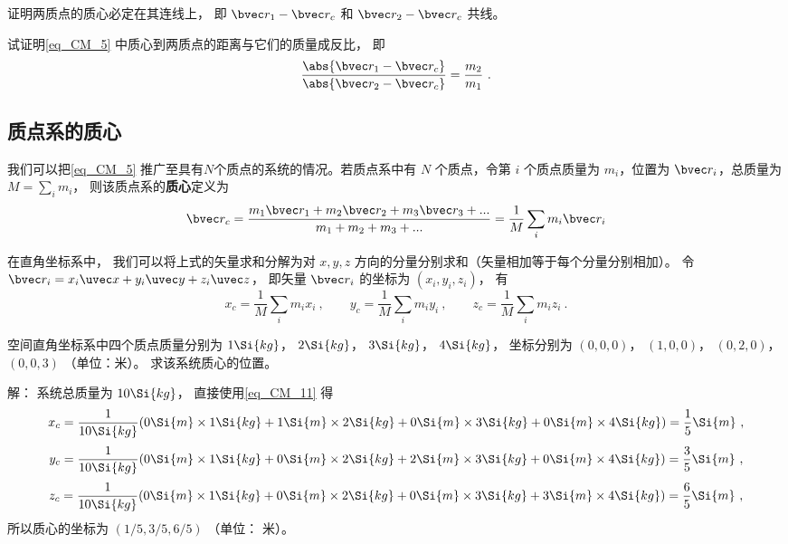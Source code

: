 \begin{exercise}{}
证明两质点的质心必定在其连线上， 即 $\bvec r_1 - \bvec r_c$ 和 $\bvec r_2 - \bvec r_c$ 共线。%
\end{exercise}

\begin{exercise}{}
试证明\autoref{eq_CM_5} 中质心到两质点的距离与它们的质量成反比， 即
\begin{equation}\label{eq_CM_6}
\frac{\abs{\bvec r_1 - \bvec r_c}}{\abs{\bvec r_2 - \bvec r_c}} = \frac{m_2}{m_1}~.
\end{equation}
\end{exercise}

\subsection{质点系的质心}
我们可以把\autoref{eq_CM_5} 推广至具有$N$个质点的系统的情况。若质点系中有 $N$ 个质点，令第 $i$ 个质点质量为 $m_i$，位置为 $\bvec r_i$，总质量为 $M = \sum\limits_i m_i$， 则该质点系的\textbf{质心}定义为
\begin{equation}\label{eq_CM_1}
\bvec r_c = \frac{m_1 \bvec r_1 + m_2 \bvec r_2 + m_3 \bvec r_3 +... }{m_1 + m_2 +m_3+...}=\frac{1}{M}\sum_i m_i \bvec r_i
\end{equation}

在直角坐标系中， 我们可以将上式的矢量求和分解为对 $x, y, z$ 方向的分量分别求和（矢量相加等于每个分量分别相加）。 令 $\bvec r_i = x_i \uvec x + y_i \uvec y + z_i \uvec z$， 即矢量 $\bvec r_i$ 的坐标为 $(x_i, y_i, z_i)$， 有
\begin{equation}\label{eq_CM_11}
x_c = \frac{1}{M}\sum_i m_i x_i ~,\qquad
y_c = \frac{1}{M}\sum_i m_i y_i ~,\qquad
z_c = \frac{1}{M}\sum_i m_i z_i~.
\end{equation}

\begin{example}{}
空间直角坐标系中四个质点质量分别为 $1 \Si{kg}$， $2 \Si{kg}$， $3 \Si{kg}$， $4 \Si{kg}$， 坐标分别为 $(0, 0, 0)$， $(1, 0, 0)$， $(0, 2, 0)$， $(0, 0, 3)$ （单位：米）。 求该系统质心的位置。

解： 系统总质量为 $10 \Si{kg}$， 直接使用\autoref{eq_CM_11} 得
\begin{equation}
x_c = \frac{1}{10 \Si{kg}} (0 \Si{m} \times 1 \Si{kg} + 1 \Si{m}\times 2 \Si{kg} + 0\Si{m} \times 3 \Si{kg} + 0 \Si{m}\times 4 \Si{kg}) = \frac15 \Si{m}~,
\end{equation}
\begin{equation}
y_c = \frac{1}{10 \Si{kg}} (0\Si{m}\times 1 \Si{kg} + 0\Si{m} \times 2 \Si{kg} + 2\Si{m} \times 3 \Si{kg} + 0 \Si{m}\times 4 \Si{kg}) = \frac35 \Si{m}~,
\end{equation}
\begin{equation}
z_c = \frac{1}{10 \Si{kg}} (0\Si{m}\times 1 \Si{kg} + 0\Si{m} \times 2 \Si{kg} + 0\Si{m} \times 3 \Si{kg} + 3 \Si{m}\times 4 \Si{kg}) = \frac65 \Si{m}~,
\end{equation}
所以质心的坐标为 $(1/5, 3/5, 6/5)$ （单位： 米）。
\end{example}

